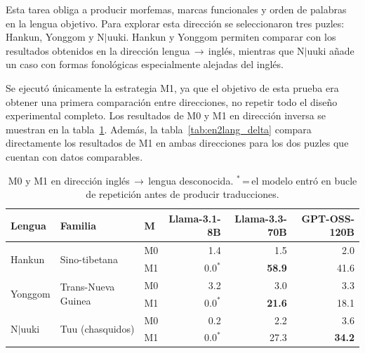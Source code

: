 Esta tarea obliga a producir morfemas, marcas funcionales y orden de palabras en la lengua objetivo. Para explorar esta dirección se seleccionaron tres puzles: Hankun, Yonggom y N$|$uuki. Hankun y Yonggom permiten comparar con los resultados obtenidos en la dirección lengua\,$\rightarrow$\,inglés, mientras que N$|$uuki añade un caso con formas fonológicas especialmente alejadas del inglés.

Se ejecutó únicamente la estrategia M1, ya que el objetivo de esta prueba era obtener una primera comparación entre direcciones, no repetir todo el diseño experimental completo. Los resultados de M0 y M1 en dirección inversa se muestran en la tabla~\ref{tab:en2lang}. Además, la tabla~\ref{tab:en2lang_delta} compara directamente los resultados de M1 en ambas direcciones para los dos puzles que cuentan con datos comparables.

\begin{table}[H]
	\centering
	\caption{M0 y M1 en dirección inglés\,$\rightarrow$\,lengua desconocida. $^*$\,=\,el modelo entró en bucle de repetición antes de producir traducciones.}
	\label{tab:en2lang}
	{\fontsize{10.5pt}{12pt}\selectfont
		\begin{tabular*}{0.95\textwidth}{@{\extracolsep{\fill}} lllrrr}
			\toprule
			\textbf{Lengua} & \textbf{Familia} & \textbf{M}
			& \textbf{Llama-3.1-8B} & \textbf{Llama-3.3-70B} & \textbf{GPT-OSS-120B} \\
			\midrule
			\multirow{2}{*}{Hankun}
			& \multirow{2}{*}{Sino-tibetana}
			& M0 & 1.4 & 1.5 & 2.0 \\
			& & M1 & $0.0^*$ & \textbf{58.9} & 41.6 \\
			\midrule
			\multirow{2}{*}{Yonggom}
			& \multirow{2}{*}{Trans-Nueva Guinea}
			& M0 & 3.2 & 3.0 & 3.3 \\
			& & M1 & $0.0^*$ & \textbf{21.6} & 18.1 \\
			\midrule
			\multirow{2}{*}{N$|$uuki}
			& \multirow{2}{*}{Tuu (chasquidos)}
			& M0 & 0.2 & 2.2 & 3.6 \\
			& & M1 & $0.0^*$ & 27.3 & \textbf{34.2} \\
			\bottomrule
		\end{tabular*}
	}
\end{table}

